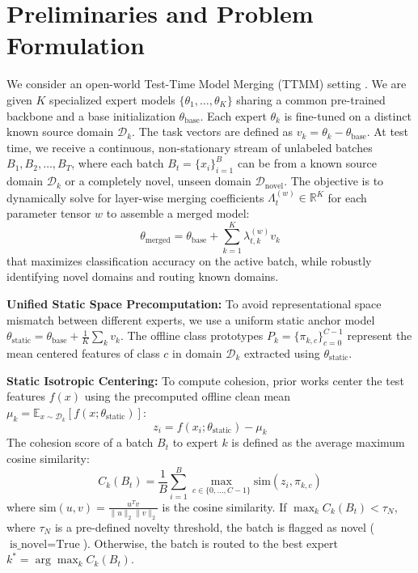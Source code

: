 \documentclass{article}
\theoremstyle{plain}
\theoremstyle{definition}
\theoremstyle{remark}
\begin{document}
\section{Preliminaries and Problem Formulation}
\label{sec:prelims}
We consider an open-world Test-Time Model Merging (TTMM) setting \cite{proto_ttmm}. We are given $K$ specialized expert models $\{\theta_1, \ldots, \theta_K\}$ sharing a common pre-trained backbone and a base initialization $\theta_{\text{base}}$. Each expert $\theta_k$ is fine-tuned on a distinct known source domain $\mathcal{D}_k$. The task vectors are defined as $v_k = \theta_k - \theta_{\text{base}}$. At test time, we receive a continuous, non-stationary stream of unlabeled batches $B_1, B_2, \ldots, B_T$, where each batch $B_t = \{x_i\}_{i=1}^B$ can be from a known source domain $\mathcal{D}_k$ or a completely novel, unseen domain $\mathcal{D}_{\text{novel}}$. The objective is to dynamically solve for layer-wise merging coefficients $\Lambda_t^{(w)} \in \mathbb{R}^K$ for each parameter tensor $w$ to assemble a merged model:
\begin{equation}
  \theta_{\text{merged}} = \theta_{\text{base}} + \sum_{k=1}^K \lambda_{t, k}^{(w)} v_k
\end{equation}
that maximizes classification accuracy on the active batch, while robustly identifying novel domains and routing known domains.

\textbf{Unified Static Space Precomputation:} To avoid representational space mismatch between different experts, we use a uniform static anchor model $\theta_{\text{static}} = \theta_{\text{base}} + \frac{1}{K}\sum_k v_k$. The offline class prototypes $P_k = \{\pi_{k,c}\}_{c=0}^{C-1}$ represent the mean centered features of class $c$ in domain $\mathcal{D}_k$ extracted using $\theta_{\text{static}}$.

\textbf{Static Isotropic Centering:} To compute cohesion, prior works center the test features $f(x)$ using the precomputed offline clean mean $\mu_k = \mathbb{E}_{x \sim \mathcal{D}_k}[f(x; \theta_{\text{static}})]$:
\begin{equation}
  z_i = f(x_i; \theta_{\text{static}}) - \mu_k
\end{equation}
The cohesion score of a batch $B_t$ to expert $k$ is defined as the average maximum cosine similarity:
\begin{equation}
  C_k(B_t) = \frac{1}{B} \sum_{i=1}^B \max_{c \in \{0, \dots, C-1\}} \text{sim}(z_i, \pi_{k,c})
\end{equation}
where $\text{sim}(u, v) = \frac{u^T v}{\|u\|_2 \|v\|_2}$ is the cosine similarity. If $\max_k C_k(B_t) < \tau_N$, where $\tau_N$ is a pre-defined novelty threshold, the batch is flagged as novel ($\text{is\_novel} = \text{True}$). Otherwise, the batch is routed to the best expert $k^* = \arg\max_k C_k(B_t)$.
\end{document}
